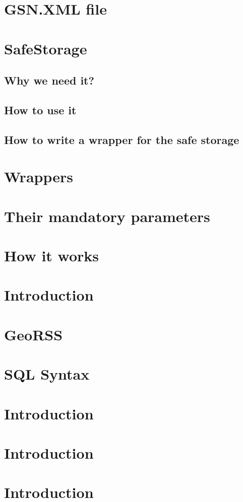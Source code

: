 \section{GSN.XML file}
\section{SafeStorage}
\subsection{Why we need it? }
\subsection{How to use it }
\subsection{How to write a wrapper for the safe storage}
\section{Wrappers}
\section{Their mandatory parameters}
\section{How it works}
\section{Introduction}
\section{GeoRSS}
\section{SQL Syntax}
\section{Introduction}
\section{Introduction}
\section{Introduction}

